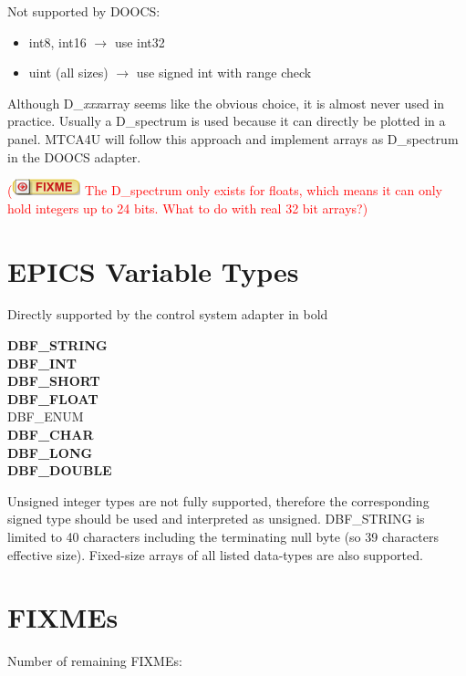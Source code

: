 \documentclass[11pt,a4paper]{scrartcl}
\newcounter{nFixmes}
\newcommand{\fixme}[1]{\addtocounter{nFixmes}{1}\textcolor{red}{(\includegraphics[height=2ex]{fixme} #1)}\xspace}
\begin{document}
Not supported by DOOCS:
\begin{itemize}
\item int8, int16 $\rightarrow$ use int32
\item uint (all sizes) $\rightarrow$ use signed int with range check
\end{itemize}

Although D\_\textit{xxx}array seems like the obvious choice, it is almost never used in practice.
Usually a D\_spectrum is used because it can directly be plotted in a panel. MTCA4U
will follow this approach and implement arrays as D\_spectrum in the DOOCS adapter.
\fixme{The D\_spectrum only exists for floats, which means it can only hold integers up to 24 bits. What to do with real 32 bit arrays?}

\section{EPICS Variable Types}
Directly supported by the control system adapter in bold
\begin{multicols}{3}
\noindent \textbf{DBF\_STRING}\\
\textbf{DBF\_INT}\\
\textbf{DBF\_SHORT}\\
\textbf{DBF\_FLOAT}\\
DBF\_ENUM\\
\textbf{DBF\_CHAR}\\
\textbf{DBF\_LONG}\\
\textbf{DBF\_DOUBLE}
\end{multicols}

Unsigned integer types are not fully supported, therefore the corresponding
signed type should be used and interpreted as unsigned. DBF\_STRING is
limited to 40 characters including the terminating null byte (so 39
characters effective size). Fixed-size arrays of all listed data-types
are also supported.

\section{FIXMEs}
Number of remaining FIXMEs: 
\end{document}

